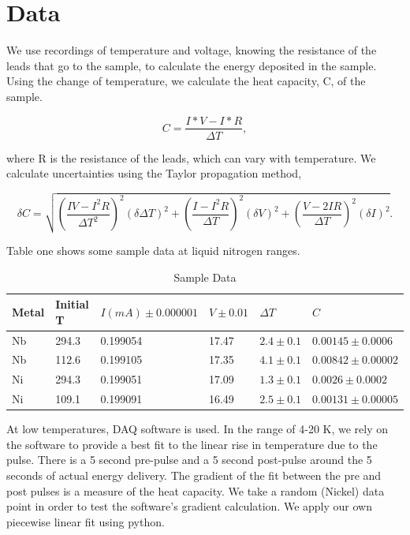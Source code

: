 \documentclass{article}
\begin{document}
\section{Data}


We use recordings of temperature and voltage, knowing the resistance of the leads that go to the sample, to calculate the energy deposited in the sample. Using the change of temperature, we calculate the heat capacity, C, of the sample.

\begin{equation}
	C = \frac{I*V - I*R}{\Delta T},
\end{equation}

where R is the resistance of the leads, which can vary with temperature. We calculate uncertainties using the Taylor propagation method, \cite{taylor}

\begin{equation}
	\delta C = \sqrt{(\frac{IV - I^2R}{{\Delta T}^2})^2 (\delta \Delta T)^2 + (\frac{I - I^2R}{\Delta T})^2 (\delta V)^2 + (\frac{V - 2IR}{\Delta T})^2 (\delta I)^2}.
\end{equation}

Table one shows some sample data at liquid nitrogen ranges.

\begin{table}[]
\centering
\caption{Sample Data}
\label{sample}
\begin{tabular}{@{}llllll@{}}
\toprule
Metal & Initial T & $I (mA) \pm 0.000001$ & $V \pm 0.01$ & $\Delta T$    & $C$                   \\ \midrule
Nb    & 294.3     & 0.199054              & 17.47        & $2.4 \pm 0.1$ & $0.00145 \pm 0.0006$  \\
Nb    & 112.6     & 0.199105              & 17.35        & $4.1 \pm 0.1$ & $0.00842 \pm 0.00002$ \\
Ni    & 294.3     & 0.199051              & 17.09        & $1.3 \pm 0.1$ & $0.0026 \pm 0.0002$   \\
Ni    & 109.1     & 0.199091              & 16.49        & $2.5 \pm 0.1$ & $0.00131 \pm 0.00005$ \\ \bottomrule
\end{tabular}
\end{table}

At low temperatures, DAQ software is used. In the range of 4-20 K, we rely on the software to provide a best fit to the linear rise in temperature due to the pulse. There is a 5 second pre-pulse and a 5 second post-pulse around the 5 seconds of actual energy delivery. The gradient of the fit between the pre and post pulses is a measure of the heat capacity. We take a random (Nickel) data point in order to test the software's gradient calculation. We apply our own piecewise linear fit using python.
\end{document}
